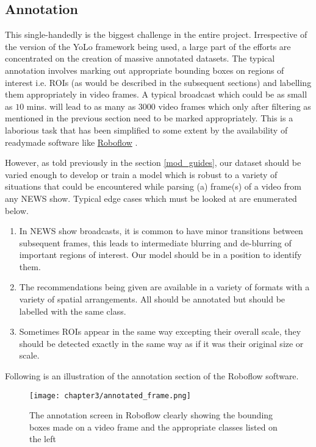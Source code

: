 \subsection{Annotation}
This single-handedly is the biggest challenge in the entire project. Irrespective of the version of the YoLo framework being used, a large part of the efforts are concentrated on the creation of massive annotated datasets. The typical annotation involves marking out appropriate bounding boxes on regions of interest i.e. ROIs (as would be described in the subsequent sections) and labelling them appropriately in video frames. A typical broadcast which could be as small as $10$ mins. will lead to as many as $3000$ video frames which only after filtering as mentioned in the previous section need to be marked appropriately. This is a laborious task that has been simplified to some extent by the availability of readymade software like \href{https://roboflow.com/annotate}{Roboflow} \cite{rb2022}. \par

However, as told previously in the section \ref{mod_guides}, our dataset should be varied enough to develop or train a model which is robust to a variety of situations that could be encountered while parsing (a) frame(s) of a video from any NEWS show. Typical edge cases which must be looked at are enumerated below.
\begin{enumerate}
 \item In NEWS show broadcasts, it is common to have minor transitions between subsequent frames, this leads to intermediate blurring and de-blurring of important regions of interest. Our model should be in a position to identify them.
 \item The recommendations being given are available in a variety of formats with a variety of spatial arrangements. All should be annotated but should be labelled with the same class.
 \item Sometimes ROIs appear in the same way excepting their overall scale, they should be detected exactly in the same way as if it was their original size or scale.
\end{enumerate}
Following is an illustration of the annotation section of the Roboflow software.

\begin{figure}[h]
  \centering
  \texttt{[image: chapter3/annotated\_frame.png]}
  \caption{The annotation screen in Roboflow clearly showing the bounding boxes made on a video frame and the appropriate classes listed on the left}
  \label{fig:annot_frame}
\end{figure}

